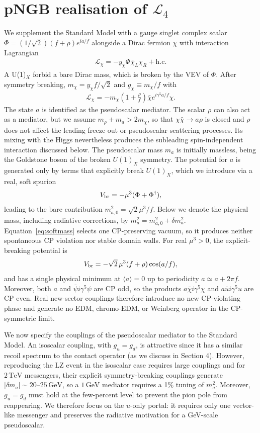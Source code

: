 \documentclass[notitlepage,floats,aps,nofootinbib,preprintnumbers,twocolumn,prl,10pt,balancelastpage]{revtex4-1}
\def\beq{\begin{equation}\begin{aligned}}
\def\eeq{\end{aligned}\end{equation}}
\newcommand{\Lag}{\mathcal L}
\begin{document}
\section{pNGB realisation of $\mathcal L_4$}
%
We supplement the Standard Model with a gauge singlet complex scalar
$ \Phi=(1/\sqrt2)(f+\rho)e^{ia/f}$
alongside a Dirac fermion $\chi$ with interaction Lagrangian
\beq
 \Lag_\chi=-y_\chi\Phi\bar\chi_L\chi_R+\mathrm{h.c.}
\label{eq:Phi}\eeq
A U(1)$_X$ forbid a bare Dirac mass, which is broken by the VEV of $\Phi$.  After symmetry breaking, $ m_\chi=y_\chi f/\sqrt2$ and $g_\chi\equiv m_\chi/f$ with
\beq
 \Lag_\chi=-m_\chi\left(1+\frac{\rho}{f}\right)
 \bar\chi e^{i\gamma^5a/f}\chi .
 \label{eq:nonlinear-mass}
\eeq
The state $a$ is identified as the pseudoscalar mediator. The scalar $\rho$ can also act as a mediator, but we assume
$m_\rho+m_a>2m_\chi$, so that $\chi\bar\chi\to a\rho$ is closed and $\rho$
does not affect the leading freeze-out or pseudoscalar-scattering processes.
Its mixing with the Higgs nevertheless produces the subleading
spin-independent interaction discussed below.
%
The pseudoscalar mass $m_a$ is initially massless, being the Goldstone boson of the broken $U(1)_X$ symmetry.
%
The potential for $a$  is generated
only by terms that explicitly break $U(1)_X$, which we introduce via a real, soft spurion 
\begin{equation}
 V_{\rm br}=-\mu^3(\Phi+\Phi^\dagger),
 \label{eq:softmass}
\end{equation}
leading to the bare contribution
$m_{a,0}^2=\sqrt2\mu^3/f$.  Below we denote the physical mass, including
radiative corrections, by $m_a^2=m_{a,0}^2+\delta m_a^2$.
 Equation~\eqref{eq:softmass} selects
one CP-preserving vacuum, so it produces neither spontaneous CP violation nor
stable domain walls. 
For real $\mu^3>0$, the explicit-breaking potential is
\[
 V_{\rm br}=-\sqrt2\,\mu^3(f+\rho)\cos(a/f),
\]
and has a single physical minimum at $\langle a\rangle=0$ up to periodicity
$a\simeq a+2\pi f$.  Moreover, both $a$ and
$\bar\psi i\gamma^5\psi$ are CP odd, so the products
$a\bar\chi i\gamma^5\chi$ and $a\bar u i\gamma^5u$ are CP even.  Real
new-sector couplings therefore introduce no new CP-violating phase and generate
no EDM, chromo-EDM, or Weinberg operator in the CP-symmetric limit.

We now specify the couplings of the pseudoscalar mediator to the Standard Model. 
%
An isoscalar coupling, with $g_u=g_d$, is attractive since it has a similar recoil spectrum to the contact operator (as we discuss in Section 4).
% 
However, reproducing the LZ event in the isoscalar case requires large couplings
and for $2\,\mathrm{TeV}$ messengers, their explicit symmetry-breaking couplings generate 
$|\delta m_a|\sim20$--$25\,\mathrm{GeV}$, so a $1\,\mathrm{GeV}$ mediator
requires a 1\% tuning of $m_a^2$. Moreover, $g_u=g_d$
must hold at the few-percent level to prevent the pion pole from reappearing.
We therefore focus on the $u$-only portal: it requires only one vector-like
messenger and preserves the radiative motivation for a GeV-scale pseudoscalar.
\end{document}
